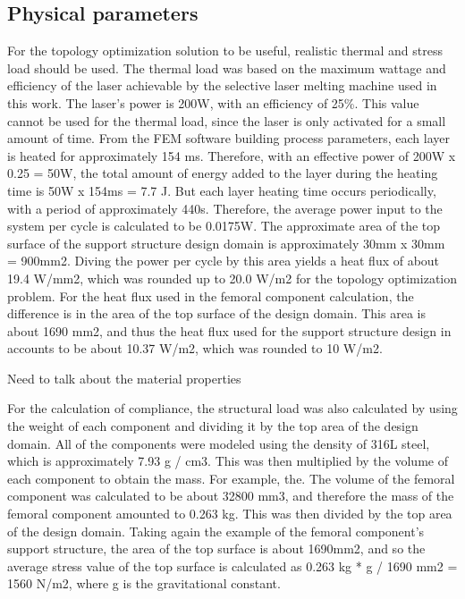 \documentclass[../main.tex]{subfiles}
\begin{document}


\subsection{Physical parameters}


For the topology optimization solution to be useful, realistic thermal and stress load should be used. The thermal load was based on the maximum wattage and efficiency of the laser achievable by the selective laser melting machine used in this work. The laser's power is 200W, with an efficiency of 25\%. This value cannot be used for the thermal load, since the laser is only activated for a small amount of time. From the FEM software building process parameters, each layer is heated for approximately 154 ms. Therefore, with an effective power of 200W x 0.25 = 50W, the total amount of energy added to the layer during the heating time is 50W x 154ms = 7.7 J. But each layer heating time occurs periodically, with a period of approximately 440s. Therefore, the average power input to the system per cycle is calculated to be 0.0175W. The approximate area of the top surface of the support structure design domain is approximately 30mm x 30mm = 900mm2. Diving the power per cycle by this area yields a heat flux of about 19.4 W/mm2, which was rounded up to 20.0 W/m2 for the topology optimization problem. For the heat flux used in the femoral component calculation, the difference is in the area of the top surface of the design domain. This area is about 1690 mm2, and thus the heat flux used for the support structure design in accounts to be about 10.37 W/m2, which was rounded to 10 W/m2.

Need to talk about the material properties



For the calculation of compliance, the structural load was also calculated by using the weight of each component and dividing it by the top area of the design domain. All of the components were modeled using the density of 316L steel, which is approximately 7.93 g / cm3. This was then multiplied by the volume of each component to obtain the mass. For example, the. The volume of the femoral component was calculated to be about 32800 mm3, and therefore the mass of the femoral component amounted to 0.263 kg. This was then divided by the top area of the design domain. Taking again the example of the femoral component's support structure, the area of the top surface is about 1690mm2, and so the average stress value of the top surface is calculated as 0.263 kg * g / 1690 mm2 = 1560 N/m2, where g is the gravitational constant. 
\end{document}
